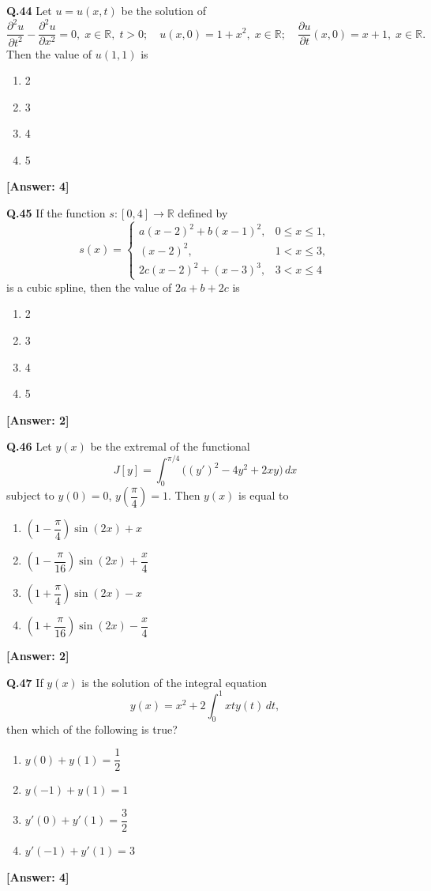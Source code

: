 \documentclass[12pt,a4paper]{article}
\newcommand{\ans}[1]{\quad\textcolor{anscolor}{\textbf{[Answer: #1]}}}
\begin{document}
\textbf{Q.44} Let $u=u(x,t)$ be the solution of
\[\dfrac{\partial^2u}{\partial t^2}-\dfrac{\partial^2u}{\partial x^2}=0,\;x\in\mathbb{R},\;t>0;\quad u(x,0)=1+x^2,\;x\in\mathbb{R};\quad\dfrac{\partial u}{\partial t}(x,0)=x+1,\;x\in\mathbb{R}.\]
Then the value of $u(1,1)$ is
\begin{enumerate}[label=\arabic*.]
\item 2 \item 3 \item 4 \item 5
\end{enumerate}\ans{4}

\textbf{Q.45} If the function $s:[0,4]\to\mathbb{R}$ defined by
\[s(x)=\begin{cases}a(x-2)^2+b(x-1)^2, & 0\le x\le1,\\(x-2)^2, & 1<x\le3,\\2c(x-2)^2+(x-3)^3, & 3<x\le4\end{cases}\]
is a cubic spline, then the value of $2a+b+2c$ is
\begin{enumerate}[label=\arabic*.]
\item 2 \item 3 \item 4 \item 5
\end{enumerate}\ans{2}

\textbf{Q.46} Let $y(x)$ be the extremal of the functional
\[J[y]=\int_0^{\pi/4}\bigl((y')^2-4y^2+2xy\bigr)\,dx\]
subject to $y(0)=0$, $y\!\left(\dfrac{\pi}{4}\right)=1$. Then $y(x)$ is equal to
\begin{enumerate}[label=\arabic*.]
\item $\left(1-\dfrac{\pi}{4}\right)\sin(2x)+x$
\item $\left(1-\dfrac{\pi}{16}\right)\sin(2x)+\dfrac{x}{4}$
\item $\left(1+\dfrac{\pi}{4}\right)\sin(2x)-x$
\item $\left(1+\dfrac{\pi}{16}\right)\sin(2x)-\dfrac{x}{4}$
\end{enumerate}\ans{2}

\textbf{Q.47} If $y(x)$ is the solution of the integral equation
\[y(x)=x^2+2\int_0^1xty(t)\,dt,\]
then which of the following is true?
\begin{enumerate}[label=\arabic*.]
\item $y(0)+y(1)=\dfrac{1}{2}$
\item $y(-1)+y(1)=1$
\item $y'(0)+y'(1)=\dfrac{3}{2}$
\item $y'(-1)+y'(1)=3$
\end{enumerate}\ans{4}
\end{document}
